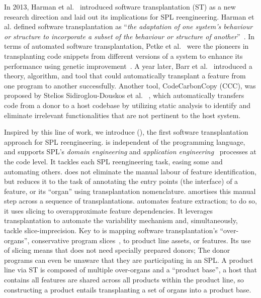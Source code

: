 
In 2013, Harman et al.~\cite{Harman2013} introduced software transplantation (ST) as a new research direction and laid out its implications for SPL reengineering. Harman et al. defined software transplantation as ``\emph{the adaptation of one system's behaviour or structure to incorporate a subset of the behaviour or structure of another}''~\cite{Harman2013}. In terms of automated software transplantation, Petke et al.~\cite{Petke2014,Petke2018} were the pioneers in transplanting code snippets from different versions of a system to enhance its performance using genetic improvement~\cite{Petke18}. A year later,  Barr et al.~\cite{Barr2015} introduced a theory, algorithm, and tool that could automatically transplant  a feature from one program to another successfully. Another tool, CodeCarbonCopy (CCC), was proposed by Stelios Sidiroglou-Douskos et al.~\cite{Sidiroglou2017} , which automatically transfers code from a donor to a host codebase by utilizing static analysis to identify and eliminate irrelevant functionalities that are not pertinent to the host system.

Inspired by this line of work, we introduce \FOUNDRY (), the first software transplantation approach for SPL reengineering. \FOUNDRY is independent of the programming language, and supports SPL's \emph{domain engineering} and \emph{application engineering}~\cite{Clements2001} processes at the code level.
It tackles each SPL reengineering task, easing some and automating others. \FOUNDRY does not eliminate the manual labour of feature identification, but reduces it to the task of annotating the entry points (\ie the interface) of a feature, or its ``organ'' using transplantation nomenclature. \FOUNDRY amortises this manual step across a sequence of transplantations. 
\FOUNDRY  automates feature extraction; to do so, it uses slicing to overapproximate feature dependencies.  It leverages transplantation to automate the variability mechanism and, simultaneously, tackle slice-imprecision.
Key to \FOUNDRY is mapping software transplantation's ``over-organs'', conservative program slices~\cite{Barr2015}, to product line assets, or features. 
Its use of slicing means that \FOUNDRY does not need specially prepared donors; The donor programs can even be unaware that they are participating in an SPL. A product line via ST is composed of multiple over-organs and a ``product base'', a host that contains all features are shared across all products within the product line, so constructing a product entails transplanting a set of organs into a product base. 

